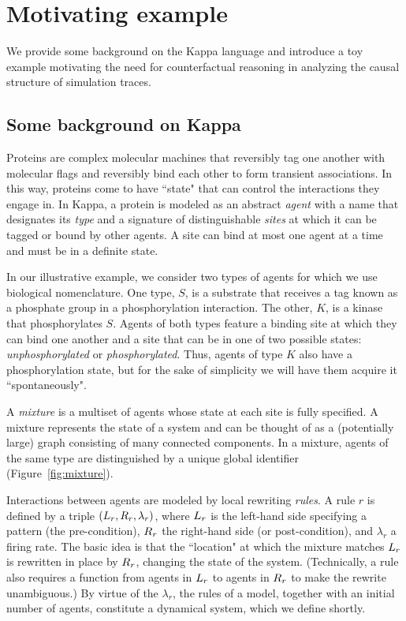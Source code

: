 
\section{Motivating example}\label{sec:example}

We provide some background on the Kappa language and
introduce a toy example motivating the need for counterfactual
reasoning in analyzing the causal structure of simulation traces.

\subsection{Some background on Kappa}\label{sec:background}

Proteins are complex molecular machines that reversibly tag one another with
molecular flags and reversibly bind each other to form transient associations.
In this way, proteins come to have ``state" that can control the interactions
they engage in. In Kappa, a protein is modeled as an abstract \emph{agent} with
a name that designates its \emph{type} and a signature of distinguishable
\emph{sites} at which it can be tagged or bound by other agents. A site can bind
at most one agent at a time and must be in a definite state.

In our illustrative example, we consider two types of agents for
which we use biological nomenclature. One type, $S$, is a substrate
that receives a tag known as a phosphate group in a phosphorylation
interaction. The other, $K$, is a kinase that phosphorylates
$S$. Agents of both types feature a binding site at which they can
bind one another and a site that can be in one of two possible states:
\emph{unphosphorylated} or \emph{phosphorylated}. Thus, agents of type
$K$ also have a phosphorylation state, but for the sake of simplicity
we will have them acquire it ``spontaneously".

A \emph{mixture} is a multiset of agents whose state at each site is
fully specified. A mixture represents the state of a system and can be
thought of as a (potentially large) graph consisting of many connected
components. In a mixture, agents of the same type are distinguished by
a unique global identifier (Figure~\ref{fig:mixture}).



Interactions between agents are
modeled by local rewriting \emph{rules}.  A rule $r$ is defined by a
triple $(L_{r}, R_{r}, \lambda_r)$, where $L_{r}$ is the
left-hand side specifying a pattern (the pre-condition), $R_{r}$
the right-hand side (or post-condition), and $\lambda_r$ a firing rate.
The basic idea is that the ``location" at which the
mixture matches $L_{r}$ is rewritten in place by $R_{r}$, changing the
state of the system. (Technically, a rule also requires a function from
agents in $L_{r}$ to agents in $R_{r}$ to make the rewrite
unambiguous.) By virtue of the $\lambda_r$, the rules of a model,
together with an initial number of agents, constitute a dynamical
system, which we define shortly.

